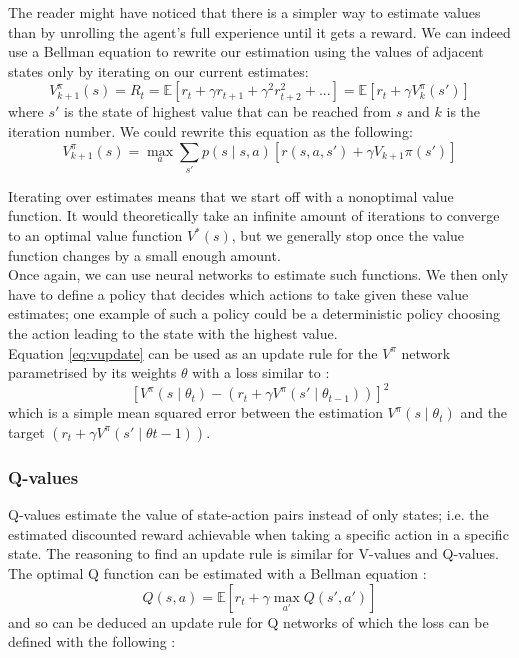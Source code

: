 The reader might have noticed that there is a simpler way to estimate values
than by unrolling the agent's full experience until it gets a reward. 
We can indeed use a Bellman equation to rewrite our estimation using
the values of adjacent states only by iterating on our current estimates:
\begin{equation}
V_{k+1}^\pi(s) = R_t = \mathbb{E}
   \left[ r_t + \gamma r_{t+1} + \gamma^2 r_{t+2}^2 + ...  \right] = 
   \mathbb{E}\left[ r_t + \gamma V_k^\pi(s')\right]
\label{eq:vupdate}
\end{equation}
where $s'$ is the state of highest value that can be reached from $s$ and $k$
is the iteration number. We could rewrite this equation as the following:
$$ V_{k+1}^\pi(s) = \max\limits_a \sum\limits_{s'} p(s\mid s,a)\left[r(s,a,s') + 
\gamma V_{k+1}\pi(s')\right]$$

Iterating over estimates means that we start off with a nonoptimal value
function. It would theoretically take an infinite amount of iterations to
converge to an optimal value function $V^*(s)$, but we generally stop once the
value function changes by a small enough amount.\\

Once again, we can
use neural networks to estimate such functions. We then only have to define
a policy that decides which actions to take given these value estimates; one
example of such a policy could be a deterministic policy choosing the action
leading to the state with the highest value.\\

Equation \ref{eq:vupdate} can be used as an update rule for the $V^\pi$ network 
parametrised by its weights $\theta$ with a loss similar to :
\begin{equation}
	\label{eq:v_update_rule}
	\left[V^\pi(s\mid \theta_t) -  \left(r_t + \gamma V^\pi(s'\mid \theta_{t-1}) \right)\right]^2 
\end{equation}
\noindent which is a simple mean squared error between the estimation $V^\pi(s\mid \theta_t)$ and
the target $\left(r_t + \gamma V^\pi(s'\mid \theta{t-1}) \right)$.

\subsubsection{Q-values} 
Q-values estimate the value of state-action pairs instead of
only states; i.e. the
estimated discounted reward achievable when taking a specific action in a 
specific state. The reasoning to find an update rule is similar for V-values
and Q-values. The optimal Q function can be estimated with a Bellman equation :
$$ Q(s, a) = \mathbb{E}\left[ r_t + \gamma \max\limits_{a'} Q(s', a') \right]$$
\noindent and so can be deduced an update rule for Q networks of which the loss
can be defined with the following :

